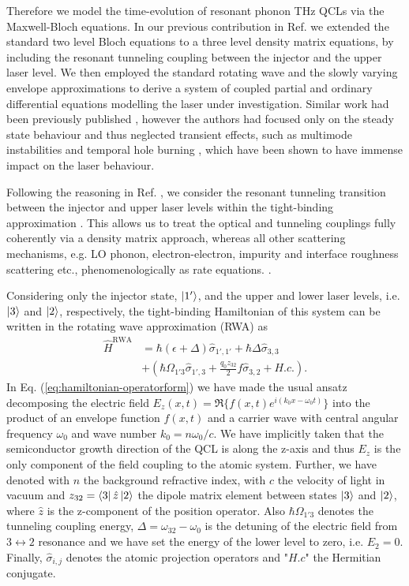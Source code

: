 \documentclass[journal]{IEEEtran}
\def\h{\hat}
\begin{document}
Therefore we model the time-evolution of resonant phonon THz QCLs via the Maxwell-Bloch equations. In our previous contribution in Ref. \cite{petz2016} we extended the standard two level Bloch equations to a three level density matrix equations, by including the resonant tunneling coupling between the injector and the upper laser level. We then employed the standard rotating wave and the slowly varying envelope approximations to derive a system of coupled partial and ordinary differential equations modelling the laser under investigation. Similar work had been previously published \cite{callebaut2005importance,kumar2009coherence,dupont2010simplified}, however the authors had focused only on the steady state behaviour and thus neglected transient effects, such as multimode instabilities \cite{wang2007coherent} and temporal hole burning \cite{burghoff2015evaluating}, which have been shown to have immense impact on the laser behaviour. 

Following the reasoning in Ref. \cite{callebaut2005importance}, we consider the resonant tunneling transition between the injector and upper laser levels within the tight-binding approximation \cite{bastard1990wave}.  This allows us to treat the optical and tunneling couplings fully coherently via a density matrix approach, whereas all other scattering mechanisms, e.g. LO phonon, electron-electron, impurity and interface roughness scattering etc., phenomenologically as rate equations. \cite{kumar2009coherence}. 

Considering only the injector state, $\ket{1'}$, and the upper and lower laser levels, i.e. $\ket{3}$ and $\ket{2}$, respectively, the tight-binding Hamiltonian of this system can be written in the rotating wave approximation (RWA) \cite{boyd2003nonlinear} as
\begin{align}
\label{eq:hamiltonian-operatorform}
\h{H}^{\text{RWA}} &= \hbar(\epsilon + \Delta) \h\sigma_{1',1'} +\hbar\Delta\h\sigma_{3,3}  \nonumber \\ &+ (\hbar\Omega_{1'3}\h\sigma_{1',3} +\frac{q_0z_{32}}{2}f \h\sigma_{3,2}+H.c.).
\end{align}
In Eq. (\ref{eq:hamiltonian-operatorform}) we have made the usual ansatz decomposing the electric field $E_z(x,t) = \Re\{f(x,t) e^{i(k_0x-\omega_0t)}\}$ into the product of an envelope function $f(x,t)$ and a carrier wave with central angular frequency $\omega_0$ and wave number $k_0 = n\omega_0/c$. We have implicitly taken that the semiconductor growth direction of the QCL is along the z-axis and thus $E_z$ is the only component of the field coupling to the atomic system. Further, we have denoted with $n$ the background refractive index, with $c$ the velocity of light in vacuum and $z_{32} = \bra{3}\h{z}\ket{2} $ the dipole matrix element between states $\ket{3}$ and $\ket{2}$, where $\h{z}$ is the z-component of the position operator. Also $\hbar\Omega_{1'3}$ denotes the tunneling coupling energy, $\Delta = \omega_{32} -\omega_0$ is the detuning of the electric field from $3\leftrightarrow 2$ resonance and we have set the energy of the lower level to zero, i.e. $E_2 = 0$. Finally, $\h \sigma_{i,j}$ denotes the atomic projection operators and "$H.c$" the Hermitian conjugate.
\end{document}

